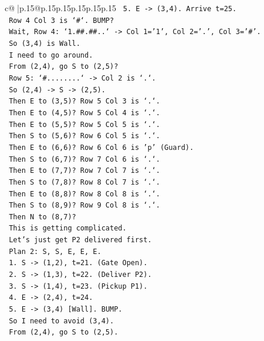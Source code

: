 \documentclass{article}
\begin{document}
{\begin{supertabular}{c@{$\;$}|p{.15\linewidth}@{}p{.15\linewidth}p{.15\linewidth}p{.15\linewidth}p{.15\linewidth}p{.15\linewidth}}
{{{\texttt{   5. E {-}> (3,4). Arrive t=25.} \\
\texttt{      Row 4 Col 3 is `\#`. BUMP?} \\
\texttt{      Wait, Row 4: `1.\#\#.\#\#..` {-}> Col 1='1', Col 2='.', Col 3='\#'.} \\
\texttt{      So (3,4) is Wall.} \\
\texttt{      I need to go around.} \\
\texttt{      From (2,4), go S to (2,5)?} \\
\texttt{      Row 5: `\#........` {-}> Col 2 is `.`.} \\
\texttt{      So (2,4) {-}> S {-}> (2,5).} \\
\texttt{      Then E to (3,5)? Row 5 Col 3 is `.`.} \\
\texttt{      Then E to (4,5)? Row 5 Col 4 is `.`.} \\
\texttt{      Then E to (5,5)? Row 5 Col 5 is `.`.} \\
\texttt{      Then S to (5,6)? Row 6 Col 5 is `.`.} \\
\texttt{      Then E to (6,6)? Row 6 Col 6 is 'p' (Guard).} \\
\texttt{      Then S to (6,7)? Row 7 Col 6 is `.`.} \\
\texttt{      Then E to (7,7)? Row 7 Col 7 is `.`.} \\
\texttt{      Then S to (7,8)? Row 8 Col 7 is `.`.} \\
\texttt{      Then E to (8,8)? Row 8 Col 8 is `.`.} \\
\texttt{      Then S to (8,9)? Row 9 Col 8 is `.`.} \\
\texttt{      Then N to (8,7)?} \\
\texttt{      This is getting complicated.} \\
\texttt{      Let's just get P2 delivered first.} \\
\texttt{      Plan 2: S, S, E, E, E.} \\
\texttt{      1. S {-}> (1,2), t=21. (Gate Open).} \\
\texttt{      2. S {-}> (1,3), t=22. (Deliver P2).} \\
\texttt{      3. S {-}> (1,4), t=23. (Pickup P1).} \\
\texttt{      4. E {-}> (2,4), t=24.} \\
\texttt{      5. E {-}> (3,4) {[}Wall{]}. BUMP.} \\
\texttt{      So I need to avoid (3,4).} \\
\texttt{      From (2,4), go S to (2,5).} \\
}}}
\end{supertabular}}
\end{document}
